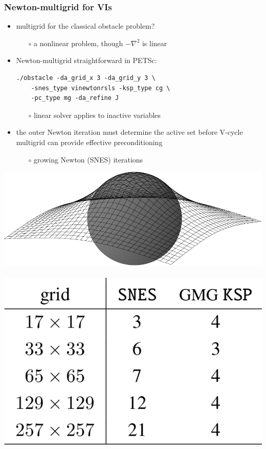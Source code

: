 \documentclass[svgnames,
               hyperref={colorlinks,citecolor=DeepPink4,linkcolor=FireBrick,urlcolor=Maroon},
               usepdftitle=false]  %
               {beamer}
\begin{document}
\begin{frame}[fragile]
\frametitle{Newton-multigrid for VIs}

\begin{itemize}
\item multigrid for the classical obstacle problem?
    \begin{itemize}
    \item[$\circ$] a nonlinear problem, though $-\nabla^2$ is linear
    \end{itemize}
\item Newton-multigrid straightforward in PETSc:
\begin{Verbatim}[xleftmargin=13mm,fontsize=\scriptsize]
./obstacle -da_grid_x 3 -da_grid_y 3 \
    -snes_type vinewtonrsls -ksp_type cg \
    -pc_type mg -da_refine J
\end{Verbatim}
    \begin{itemize}
    \item[$\circ$] linear solver applies to inactive variables
    \end{itemize}
\item the outer Newton iteration must determine the active set \alert{before} V-cycle multigrid can provide effective preconditioning
    \begin{itemize}
    \item[$\circ$] growing Newton (SNES) iterations
    \end{itemize}
\end{itemize}


\hfill \mbox{\includegraphics[height=0.2\textheight]{images/obstacle65.pdf} \hspace{15mm}
\includegraphics[height=0.25\textheight]{images/vi-newton-gmg-bad.png}}
\end{frame}
\end{document}
